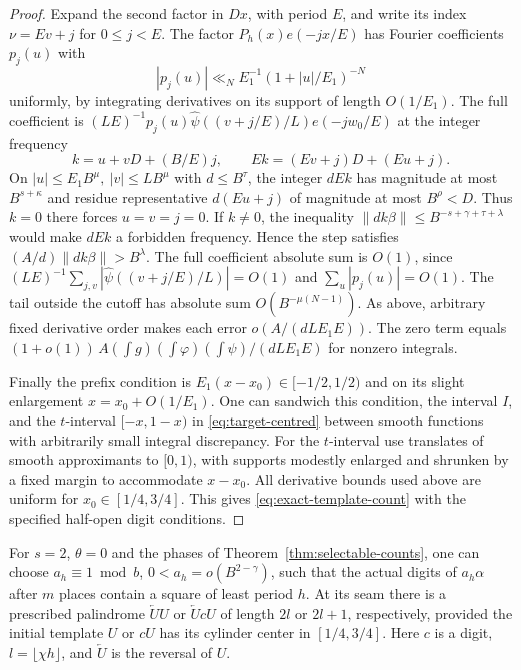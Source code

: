 \begin{proof}
Expand the second factor in \(Dx\), with period \(E\), and write
its index \(\nu=Ev+j\) for \(0\le j<E\). The factor
\(P_h(x)e(-jx/E)\) has Fourier coefficients \(p_j(u)\) with
\[
 |p_j(u)|\ll_N E_1^{-1}(1+|u|/E_1)^{-N}
\]
uniformly, by integrating derivatives on its support of length
\(O(1/E_1)\). The full coefficient is
\((LE)^{-1}p_j(u)\widehat\psi((v+j/E)/L)e(-jw_0/E)\)
at the integer frequency
\[
 k=u+vD+(B/E)j,\qquad E k=(Ev+j)D+(Eu+j).
\]
On \(|u|\le E_1B^\mu,\ |v|\le LB^\mu\) with \(d\le B^\tau\),
the integer \(dEk\) has magnitude at most \(B^{s+\kappa}\) and
residue representative \(d(Eu+j)\) of magnitude at most \(B^\rho<D\).
Thus \(k=0\) there forces \(u=v=j=0\). If \(k\ne0\), the inequality
\(\|dk\beta\|\le B^{-s+\gamma+\tau+\lambda}\) would make \(dEk\)
a forbidden frequency. Hence the step satisfies
\((A/d)\|dk\beta\|>B^\lambda\). The full coefficient absolute sum
is \(O(1)\), since \((LE)^{-1}\sum_{j,v}
|\widehat\psi((v+j/E)/L)|=O(1)\) and \(\sum_u|p_j(u)|=O(1)\).
The tail outside the cutoff has absolute sum
\(O(B^{-\mu(N-1)})\). As above, arbitrary fixed derivative order
makes each error \(o(A/(dLE_1E))\). The zero term equals
\((1+o(1))\,A(\int g)(\int\varphi)(\int\psi)/(dLE_1E)\)
for nonzero integrals.

Finally the prefix condition is \(E_1(x-x_0)\in[-1/2,1/2)\)
and on its slight enlargement \(x=x_0+O(1/E_1)\).
One can sandwich this condition, the interval \(I\), and the
\(t\)-interval \([-x,1-x)\) in \eqref{eq:target-centred} between
smooth functions with arbitrarily small integral discrepancy.
For the \(t\)-interval use translates of smooth approximants to
\([0,1)\), with supports modestly enlarged and shrunken by a
fixed margin to accommodate \(x-x_0\). All derivative bounds used
above are uniform for \(x_0\in[1/4,3/4]\). This gives
\eqref{eq:exact-template-count} with the specified half-open digit
conditions.
\end{proof}

\begin{corollary}\label{cor:phase-palindrome}
For \(s=2\), \(\theta=0\) and the phases of
Theorem~\ref{thm:selectable-counts}, one can choose
\(a_h\equiv1\bmod b\), \(0<a_h=o(B^{2-\gamma})\), such that the
actual digits of \(a_h\alpha\) after \(m\) places contain a square
of least period \(h\). At its seam there is a prescribed
palindrome \(\overleftarrow{U}U\) or \(\overleftarrow{U}cU\) of
length \(2l\) or \(2l+1\), respectively, provided the initial
template \(U\) or \(cU\) has its cylinder center in \([1/4,3/4]\).
Here \(c\) is a digit, \(l=\lfloor\chi h\rfloor\), and
\(\overleftarrow{U}\) is the reversal of \(U\).
\end{corollary}

